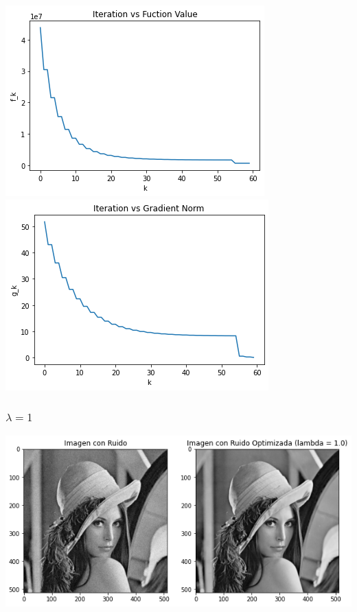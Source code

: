 \documentclass[11pt,letterpaper]{article}
\theoremstyle{definition}
\theoremstyle{definition}
\theoremstyle{definition}
\begin{document}
\begin{center}
	\includegraphics[width=0.6\linewidth]{graficas/frpr/funcion_0}
	\includegraphics[width=0.6\linewidth]{graficas/frpr/gradiente_0}
\end{center}

\subsubsection{$ \lambda = 1 $}
\begin{center}
	\includegraphics[width=0.75\linewidth]{graficas/frpr/optimizada_1}
\end{center}
\end{document}
